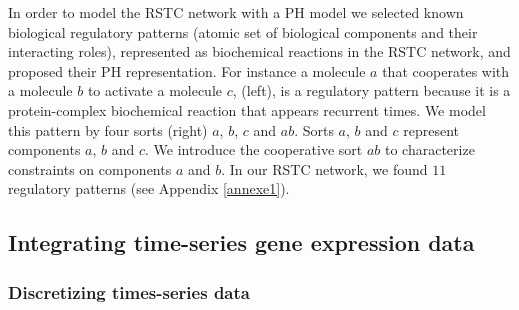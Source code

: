 \documentclass[11pt,a4paper,twoside]{epig}
\begin{document}

In order to model the RSTC network with a PH model we selected known biological regulatory 
patterns (atomic set of biological components and their interacting roles), represented 
as biochemical reactions in the RSTC network, and proposed their PH representation. 
For instance a molecule $a$ that cooperates with a molecule $b$ to activate a molecule $c$, 
 (left), is a regulatory pattern because it is a protein-complex biochemical
reaction that appears recurrent times.  
We model this pattern by four sorts  (right) $a$, $b$, $c$ and $ab$. Sorts $a$, $b$ and $c$
represent components $a$, $b$ and $c$. We introduce the cooperative sort $ab$ to characterize constraints on 
components $a$ and $b$.
In our RSTC network, we found $11$ regulatory patterns (see Appendix \ref{annexe1}). 



\subsection{Integrating time-series gene expression data}


\subsubsection{Discretizing times-series data}
\end{document}
